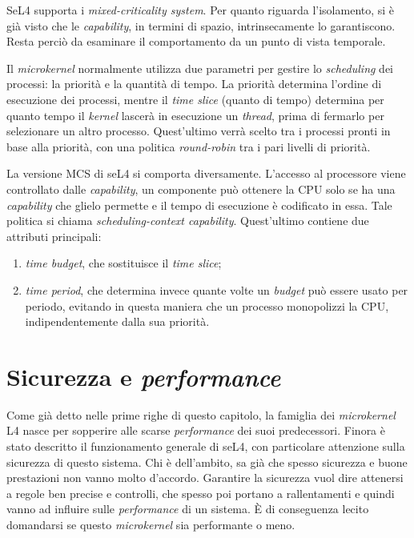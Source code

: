 SeL4 supporta i \textit{mixed-criticality system}. Per quanto riguarda l'isolamento, si è già visto che le \textit{capability}, in termini di spazio, intrinsecamente lo garantiscono. Resta perciò da esaminare il comportamento da un punto di vista temporale.

Il \textit{microkernel} normalmente utilizza due parametri per gestire lo \textit{scheduling} dei processi: la priorità e la quantità di tempo. La priorità determina l'ordine di esecuzione dei processi, mentre il \textit{time slice} (quanto di tempo) determina per quanto tempo il \textit{kernel} lascerà in esecuzione un \textit{thread}, prima di fermarlo per selezionare un altro processo. Quest'ultimo verrà scelto tra i processi pronti in base alla priorità, con una politica \textit{round-robin} tra i pari livelli di priorità.

La versione MCS di seL4 si comporta diversamente. L'accesso al processore viene controllato dalle \textit{capability}, un componente può ottenere la CPU solo se ha una \textit{capability} che glielo permette e il tempo di esecuzione è codificato in essa. Tale politica si chiama \textit{scheduling-context \textit{capability}}. Quest'ultimo contiene due attributi principali: 
\begin{enumerate}
	\item \textit{time budget}, che sostituisce il \textit{time slice};
	\item \textit{time period}, che determina invece quante volte un \textit{budget} può essere usato per periodo, evitando in questa maniera che un processo monopolizzi la CPU, indipendentemente dalla sua priorità.
\end{enumerate}

\section{Sicurezza e \textit{performance}}
Come già detto nelle prime righe di questo capitolo, la famiglia dei \textit{microkernel} L4 nasce per sopperire alle scarse \textit{performance} dei suoi predecessori. Finora è stato descritto il funzionamento generale di seL4, con particolare attenzione sulla sicurezza di questo sistema. Chi è dell'ambito, sa già che spesso sicurezza e buone prestazioni non vanno molto d'accordo. Garantire la sicurezza vuol dire attenersi a regole ben precise e controlli, che spesso poi portano a rallentamenti e quindi vanno ad influire sulle \textit{performance} di un sistema. È di conseguenza lecito domandarsi se questo \textit{microkernel} sia performante o meno.

